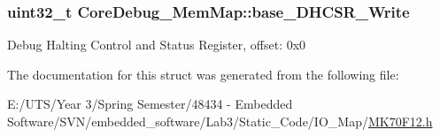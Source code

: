 \subsubsection[{base\+\_\+\+D\+H\+C\+S\+R\+\_\+\+Write}]{\setlength{\rightskip}{0pt plus 5cm}uint32\+\_\+t Core\+Debug\+\_\+\+Mem\+Map\+::base\+\_\+\+D\+H\+C\+S\+R\+\_\+\+Write}\label{struct_core_debug___mem_map_a57de52c8c1eb5789546543f2408ce487}
Debug Halting Control and Status Register, offset\+: 0x0 

The documentation for this struct was generated from the following file\+:\begin{DoxyCompactItemize}
\item 
E\+:/\+U\+T\+S/\+Year 3/\+Spring Semester/48434 -\/ Embedded Software/\+S\+V\+N/embedded\+\_\+software/\+Lab3/\+Static\+\_\+\+Code/\+I\+O\+\_\+\+Map/\hyperlink{_m_k70_f12_8h}{M\+K70\+F12.\+h}\end{DoxyCompactItemize}

